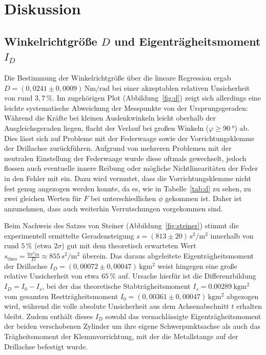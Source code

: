 \section{Diskussion}
\label{sec:Diskussion}

\subsection{Winkelrichtgröße $D$ und Eigenträgheitsmoment $I_D$}

Die Bestimmung der Winkelrichtgröße über die lineare Regression ergab $D = (0{,}0241 \pm 0{,}0009)\,\unit{\newton\meter\per\radian}$ bei einer akzeptablen relativen Unsicherheit von rund $3{,}7\,\%$. Im zugehörigen Plot (Abbildung~\ref{fig:d}) zeigt sich allerdings eine leichte systematische Abweichung der Messpunkte von der Ursprungsgeraden: Während die Kräfte bei kleinen Auslenkwinkeln leicht oberhalb der Ausgleichsgeraden liegen, flacht der Verlauf bei großen Winkeln ($\varphi \geq \qty{90}{\degree}$) ab. Dies lässt sich auf Probleme mit der Federwaage sowie der Vorrichtungsklemme der Drillachse zurückführen. Aufgrund von mehreren Problemen mit der neutralen Einstellung der Federwaage wurde diese oftmals gewechselt, jedoch flossen auch eventuelle innere Reibung oder mögliche Nichtlinearitäten der Feder in den Fehler mit ein. Dazu wird vermutet, dass die Vorrichtungsklemme nicht fest genug angezogen werden konnte, da es, wie in Tabelle~\ref{tab:d} zu sehen, zu zwei gleichen Werten für $F$ bei unterschiedlichen $\phi$ gekommen ist. Daher ist anzunehmen, dass auch weiterhin Verrutschungen vorgekommen sind.

Beim Nachweis des Satzes von Steiner (Abbildung~\ref{fig:steiner}) stimmt die experimentell ermittelte Geradensteigung $s = (813 \pm 20)\,\unit{\second\squared\per\meter\squared}$ innerhalb von rund $5\,\%$ (etwa $2\sigma$) gut mit dem theoretisch erwarteten Wert $s_{\text{theo}} = \frac{8\pi^2 m}{D} \approx \qty{855}{\second\squared\per\meter\squared}$ überein. Das daraus abgeleitete Eigenträgheitsmoment der Drillachse $I_D = (0{,}00072 \pm 0{,}00047)\,\unit{\kilogram\meter\squared}$ weist hingegen eine große relative Unsicherheit von etwa $65\,\%$ auf. Ursache hierfür ist die Differenzbildung $I_D = I_0 - I_s$, bei der das theoretische Stabträgheitsmoment $I_s = \qty{0,00289}{\kilogram\meter\squared}$ vom gesamten Restträgheitsmoment $I_0 = (0{,}00361 \pm 0{,}00047)\,\unit{\kilogram\meter\squared}$ abgezogen wird, während die volle absolute Unsicherheit aus dem Achsenabschnitt $t$ erhalten bleibt. Zudem enthält dieses $I_D$ sowohl das vernachlässigte Eigenträgheitsmoment der beiden verschobenen Zylinder um ihre eigene Schwerpunktsachse als auch das Trägheitsmoment der Klemmvorrichtung, mit der die Metallstange auf der Drillachse befestigt wurde.

